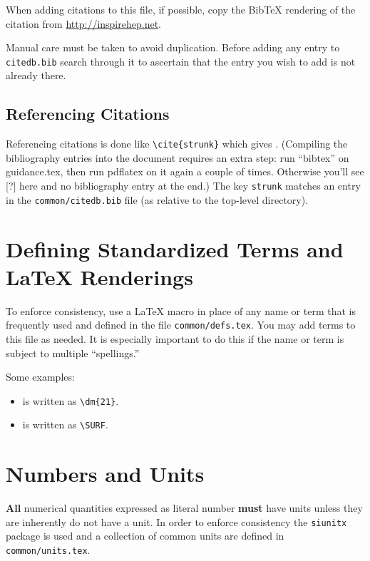 When adding citations to this file, if possible, copy the BibTeX rendering of the citation from \url{http://inspirehep.net}.

Manual care must be taken to avoid duplication.
Before adding any entry to \texttt{citedb.bib} search through it
to ascertain that the entry you wish to add is not already there.

\subsection{Referencing Citations}

Referencing citations is done like \verb|\cite{strunk}| which gives \cite{strunk}.
(Compiling the bibliography entries into the document requires an extra step: run ``bibtex'' on
 guidance.tex, then run pdflatex on it again a couple of times. Otherwise you'll see [?] here 
 and no bibliography entry at the end.) 
The key \texttt{strunk} matches an entry in the \texttt{common/citedb.bib}
file (as relative to the top-level directory).

\section{Defining Standardized Terms and \LaTeX{} Renderings}

To enforce consistency, use a \LaTeX{} macro in place of any name or
term that is frequently used and defined in the file \texttt{common/defs.tex}.  You may add terms
to this file as needed. 
It is especially important to do this if the name or term is subject
to multiple ``spellings.''

Some examples:

\begin{itemize}
\item {} is written as \verb|\dm{21}|.
\item \SURF is written as \verb|\SURF|.
\end{itemize}

\section{Numbers and Units}

\textbf{All} numerical quantities expressed as literal number
\textbf{must} have units unless they are inherently do not have a unit.
In order to enforce consistency the \texttt{siunitx} package is used
and a collection of common units are defined in
\texttt{common/units.tex}.

